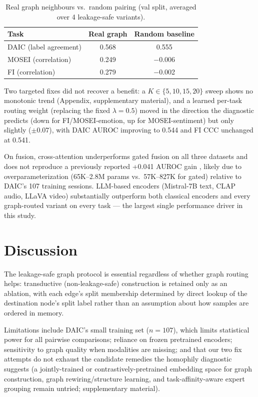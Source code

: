 \documentclass[letterpaper]{article}
\begin{document}
\begin{table}[t]
\centering
\caption{Real graph neighbours vs.\ random pairing (val split, averaged over 4 leakage-safe variants).}
\label{tab:homophily}
\small
\begin{tabular}{lcc}
\toprule
Task & Real graph & Random baseline \\
\midrule
DAIC (label agreement) & 0.568 & 0.555 \\
MOSEI (correlation) & 0.249 & $-$0.006 \\
FI (correlation) & 0.279 & $-$0.002 \\
\bottomrule
\end{tabular}
\end{table}

Two targeted fixes did not recover a benefit: a $K\in\{5,10,15,20\}$ sweep shows no monotonic trend (Appendix, supplementary material), and a learned per-task routing weight (replacing the fixed $\lambda{=}0.5$) moved in the direction the diagnostic predicts (down for FI/MOSEI-emotion, up for MOSEI-sentiment) but only slightly ($\pm0.07$), with DAIC AUROC improving to 0.544 and FI CCC unchanged at 0.541.

On fusion, cross-attention underperforms gated fusion on all three datasets and does not reproduce a previously reported +0.041 AUROC gain \cite{kim2024crossmodal}, likely due to overparameterization (65K--2.8M params vs.\ 57K--827K for gated) relative to DAIC's 107 training sessions. LLM-based encoders (Mistral-7B text, CLAP audio, LLaVA video) substantially outperform both classical encoders and every graph-routed variant on every task — the largest single performance driver in this study.

\section{Discussion}

The leakage-safe graph protocol is essential regardless of whether graph routing helps: transductive (non-leakage-safe) construction is retained only as an ablation, with each edge's split membership determined by direct lookup of the destination node's split label rather than an assumption about how samples are ordered in memory.

Limitations include DAIC's small training set ($n{=}107$), which limits statistical power for all pairwise comparisons; reliance on frozen pretrained encoders; sensitivity to graph quality when modalities are missing; and that our two fix attempts do not exhaust the candidate remedies the homophily diagnostic suggests (a jointly-trained or contrastively-pretrained embedding space for graph construction, graph rewiring/structure learning, and task-affinity-aware expert grouping remain untried; supplementary material).
\end{document}
